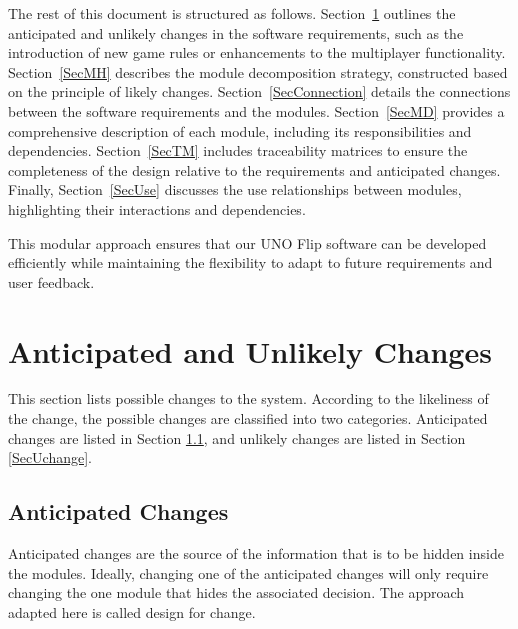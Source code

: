 \documentclass[12pt, titlepage]{article}
\begin{document}
The rest of this document is structured as follows. Section~\ref{SecChange} outlines the anticipated and unlikely changes in the software requirements, such as the introduction of new game rules or enhancements to the multiplayer functionality. Section~\ref{SecMH} describes the module decomposition strategy, constructed based on the principle of likely changes. Section~\ref{SecConnection} details the connections between the software requirements and the modules. Section~\ref{SecMD} provides a comprehensive description of each module, including its responsibilities and dependencies. Section~\ref{SecTM} includes traceability matrices to ensure the completeness of the design relative to the requirements and anticipated changes. Finally, Section~\ref{SecUse} discusses the use relationships between modules, highlighting their interactions and dependencies.

This modular approach ensures that our UNO Flip software can be developed efficiently while maintaining the flexibility to adapt to future requirements and user feedback.


\section{Anticipated and Unlikely Changes} \label{SecChange}

This section lists possible changes to the system. According to the likeliness
of the change, the possible changes are classified into two
categories. Anticipated changes are listed in Section \ref{SecAchange}, and
unlikely changes are listed in Section \ref{SecUchange}.

\subsection{Anticipated Changes} \label{SecAchange}

Anticipated changes are the source of the information that is to be hidden
inside the modules. Ideally, changing one of the anticipated changes will only
require changing the one module that hides the associated decision. The approach
adapted here is called design for
change.
\end{document}
